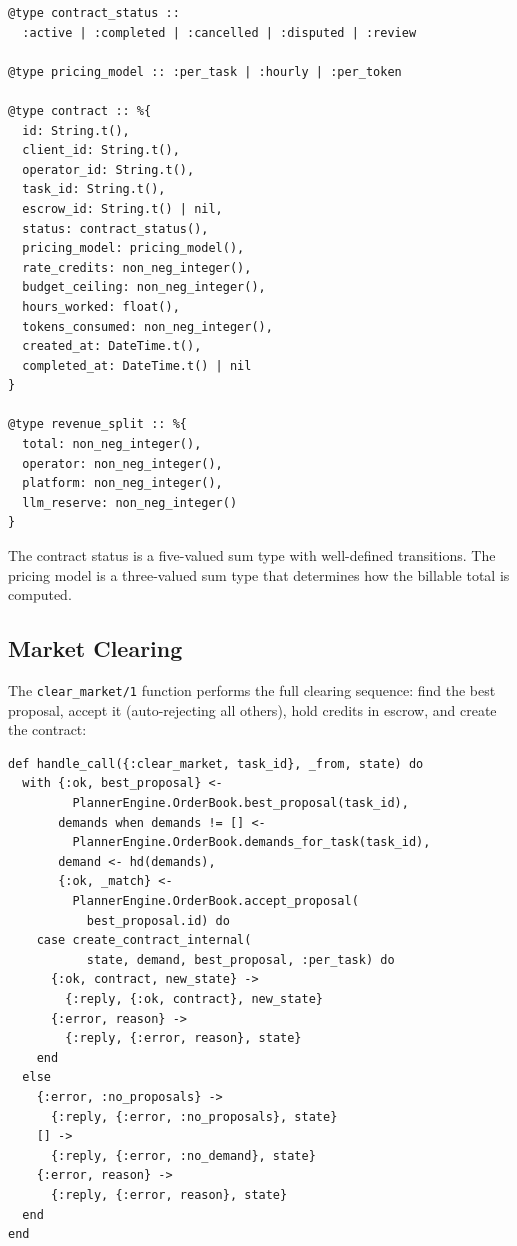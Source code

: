 \documentclass[12pt,a4paper]{article}
\theoremstyle{plain}
\theoremstyle{definition}
\begin{document}
\begin{lstlisting}[caption={Market types},label={lst:market-types}]
@type contract_status ::
  :active | :completed | :cancelled | :disputed | :review

@type pricing_model :: :per_task | :hourly | :per_token

@type contract :: %{
  id: String.t(),
  client_id: String.t(),
  operator_id: String.t(),
  task_id: String.t(),
  escrow_id: String.t() | nil,
  status: contract_status(),
  pricing_model: pricing_model(),
  rate_credits: non_neg_integer(),
  budget_ceiling: non_neg_integer(),
  hours_worked: float(),
  tokens_consumed: non_neg_integer(),
  created_at: DateTime.t(),
  completed_at: DateTime.t() | nil
}

@type revenue_split :: %{
  total: non_neg_integer(),
  operator: non_neg_integer(),
  platform: non_neg_integer(),
  llm_reserve: non_neg_integer()
}
\end{lstlisting}

The contract status is a five-valued sum type with well-defined transitions. The pricing model is a three-valued sum type that determines how the billable total is computed.

\subsection{Market Clearing}

The \texttt{clear\_market/1} function performs the full clearing sequence: find the best proposal, accept it (auto-rejecting all others), hold credits in escrow, and create the contract:

\begin{lstlisting}[caption={Market clearing: the full sequence},label={lst:market-clear}]
def handle_call({:clear_market, task_id}, _from, state) do
  with {:ok, best_proposal} <-
         PlannerEngine.OrderBook.best_proposal(task_id),
       demands when demands != [] <-
         PlannerEngine.OrderBook.demands_for_task(task_id),
       demand <- hd(demands),
       {:ok, _match} <-
         PlannerEngine.OrderBook.accept_proposal(
           best_proposal.id) do
    case create_contract_internal(
           state, demand, best_proposal, :per_task) do
      {:ok, contract, new_state} ->
        {:reply, {:ok, contract}, new_state}
      {:error, reason} ->
        {:reply, {:error, reason}, state}
    end
  else
    {:error, :no_proposals} ->
      {:reply, {:error, :no_proposals}, state}
    [] ->
      {:reply, {:error, :no_demand}, state}
    {:error, reason} ->
      {:reply, {:error, reason}, state}
  end
end
\end{lstlisting}
\end{document}
